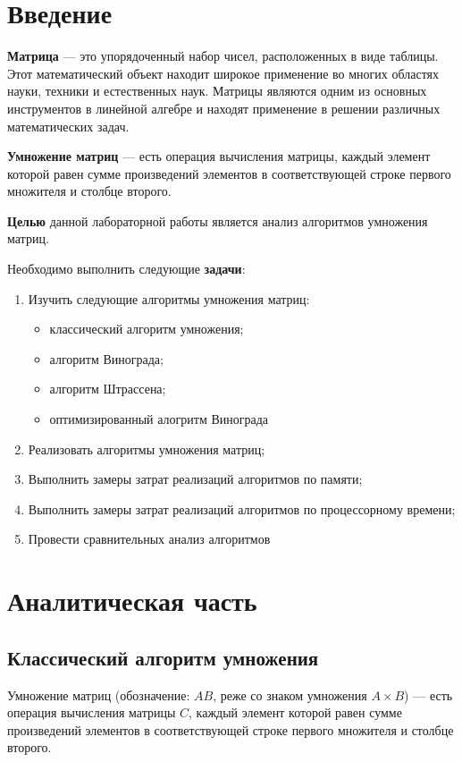 \chapter*{Введение}

\textbf{Матрица} — это упорядоченный набор чисел, расположенных в виде таблицы. Этот математический объект находит широкое применение во многих областях науки, техники и естественных наук. Матрицы являются одним из основных инструментов в линейной алгебре и находят применение в решении различных математических задач.

\textbf{Умножение матриц} — есть операция вычисления матрицы, каждый элемент которой равен сумме произведений элементов в соответствующей строке первого множителя и столбце второго.

\textbf{Целью} данной лабораторной работы является анализ алгоритмов умножения матриц.

Необходимо выполнить следующие \textbf{задачи}:
\begin{enumerate}
    \item Изучить следующие алгоритмы умножения матриц: %
    \begin{itemize}    
        \item классический алгоритм умножения;
        \item алгоритм Винограда;
        \item алгоритм Штрассена;        
        \item оптимизированный алогритм Винограда
    \end{itemize}
    \item Реализовать алгоритмы умножения матриц;%
    \item Выполнить замеры затрат реализаций алгоритмов по памяти;
    \item Выполнить замеры затрат реализаций алгоритмов по процессорному времени;
    \item Провести сравнительных анализ алгоритмов
\end{enumerate}

\chapter{Аналитическая часть}

\section{Классический алгоритм умножения}
Умножение матриц (обозначение: $AB$, реже со знаком умножения $A \times B$) — есть операция вычисления матрицы $C$, каждый элемент которой равен сумме произведений элементов в соответствующей строке первого множителя и столбце второго.

